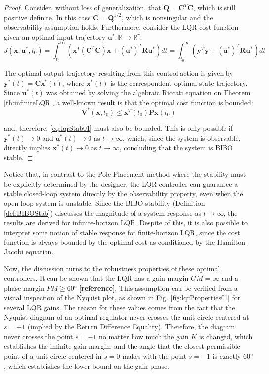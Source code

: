\documentclass[a4paper,11pt]{book}
\numberwithin{figure}{chapter}
\numberwithin{equation}{chapter}
\numberwithin{table}{chapter}
\theoremstyle{definition}
\begin{document}
\begin{proof}
	Consider, without loss of generalization, that $\bm{Q} = \bm{C}^T \bm{C}$, which is still positive definite. In this case $\bm{C} = \bm{Q}^{1/2}$, which is nonsingular and the observability assumption holds. Furthermore, consider the LQR cost function given an optimal input trajectory $\bm{u}^* : \mathbb{R} \rightarrow \mathbb{R}^r$:
	\begin{equation} \label{eq:lqrStab01}
	J(\bm{x},\bm{u}^*,t_0) = \int_{t_0}^{\infty} \left( \bm{x}^T (\bm{C}^T \bm{C}) \bm{x} + (\bm{u}^*)^T \bm{R} \bm{u}^* \right) dt = \int_{t_0}^{\infty} \left( \bm{y}^T \bm{y} + (\bm{u}^*)^T \bm{R} \bm{u}^* \right) dt
\end{equation}

The optimal output trajectory resulting from this control action is given by $\bm{y}^*(t) = \bm{C} \bm{x}^*(t)$, where $\bm{x}^*(t)$ is the correspondent optimal state trajectory. Since $\bm{u}^*(t)$ was obtained by solving the algebraic Riccati equation on Theorem \ref{th:infiniteLQR}, a well-known result is that the optimal cost function is bounded:
\begin{equation}
	\bm{V}^*(\bm{x}, t_0) \leq \bm{x}^T(t_0) \bm{P} \bm{x}(t_0)
\end{equation}

\noindent and, therefore, \eqref{eq:lqrStab01} must also be bounded. This is only possible if $\bm{y}^*(t) \to 0$ and $\bm{u}^*(t) \to 0$ as $t \to \infty$, which, since the system is observable, directly implies $\bm{x}^*(t) \to 0$ as $t \to \infty$, concluding that the system is BIBO stable.
\end{proof}

Notice that, in contrast to the Pole-Placement method where the stability must be explicitly determined by the designer, the LQR controller can guarantee a stable closed-loop system directly by the observability property, even when the open-loop system is unstable. Since the BIBO stability (Definition \ref{def:BIBOStab}) discusses the magnitude of a system response as $t \to \infty$, the results are derived for infinite-horizon LQR. Despite of this, it is also possible to interpret some notion of stable response for finite-horizon LQR, since the cost function is always bounded by the optimal cost as conditioned by the Hamilton-Jacobi equation.

Now, the discussion turns to the robustness properties of these optimal controllers. It can be shown that the LQR has a gain margin $GM = \infty$ and a phase margin $PM \geq \ang{60}$ \textbf{[reference]}. This assumption can be verified from a visual inspection of the Nyquist plot, as shown in Fig. \ref{fig:lqrProperties01} for several LQR gains. The reason for these values comes from the fact that the Nyquist diagram of an optimal regulator never crosses the unit circle centered at $s = -1$ (implied by the Return Difference Equality). Therefore, the diagram never crosses the point $s = -1$ no matter how much the gain $K$ is changed, which establishes the infinite gain margin, and the angle that the closest permissible point of a unit circle centered in $s = 0$ makes with the point $s = -1$ is exactly $\ang{60}$, which establishes the lower bound on the gain phase.
\end{document}
